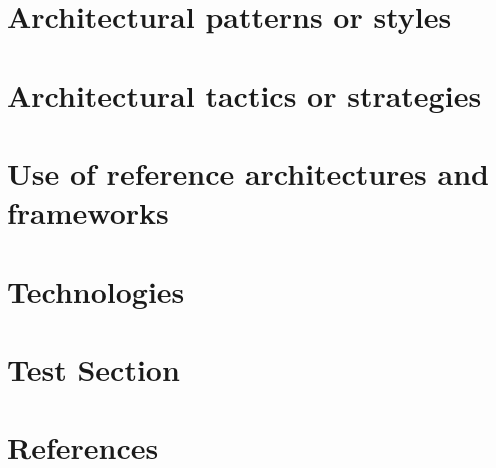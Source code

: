 \documentclass[11pt,a4paper,titlepage]{article}
\begin{document}
	

\section{Architectural patterns or styles}

	

\section{Architectural tactics or strategies}

	

\section{Use of reference architectures and frameworks}

	
	

\section {Technologies}



\section{Test Section}



\section{References}


\end{document}
